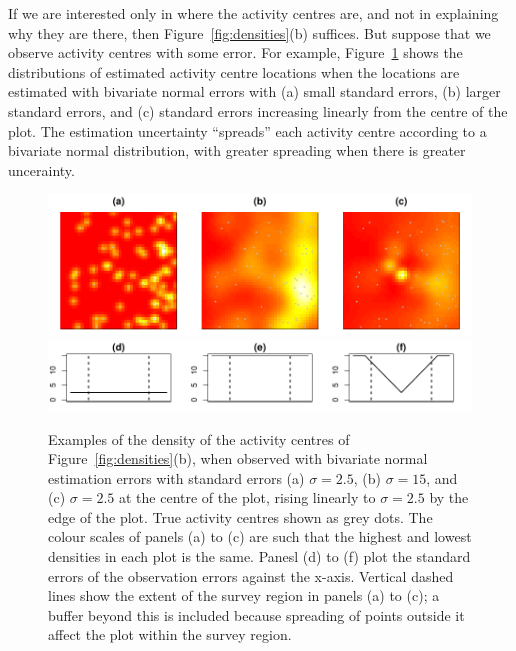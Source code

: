 \documentclass[10pt,a4paper]{article}
\begin{document}
If we are interested only in where the activity centres are, and not in explaining why they are there, then Figure~\ref{fig:densities}(b) suffices. But suppose that we observe activity centres with some error. For example, Figure~\ref{fig:acesterr} shows the distributions of estimated activity centre locations when the locations are estimated with bivariate normal errors with (a) small standard errors, (b) larger standard errors, and (c) standard errors increasing linearly from the centre of the plot. The estimation uncertainty ``spreads'' each activity centre according to a bivariate normal distribution, with greater spreading when there is greater uncerainty.

\begin{figure}[htbp]
\centering
\includegraphics[width=\textwidth]{acesterr.pdf}
\includegraphics[width=\textwidth]{sigmas.pdf}
\caption{Examples of the density of the activity centres of Figure~\ref{fig:densities}(b), when observed with bivariate normal estimation errors with standard errors (a) $\sigma=2.5$, (b) $\sigma=15$, and (c) $\sigma=2.5$ at the centre of the plot, rising linearly to $\sigma=2.5$ by the edge of the plot. True activity centres shown as grey dots. The colour scales of panels (a) to (c) are such that the highest and lowest densities in each plot is the same.
Panesl (d) to (f) plot the standard errors of the observation errors against the x-axis. Vertical dashed lines show the extent of the survey region in panels (a) to (c); a buffer beyond this is included because spreading of points outside it affect the plot within the survey region.}
\label{fig:acesterr}
\end{figure}
\end{document}
